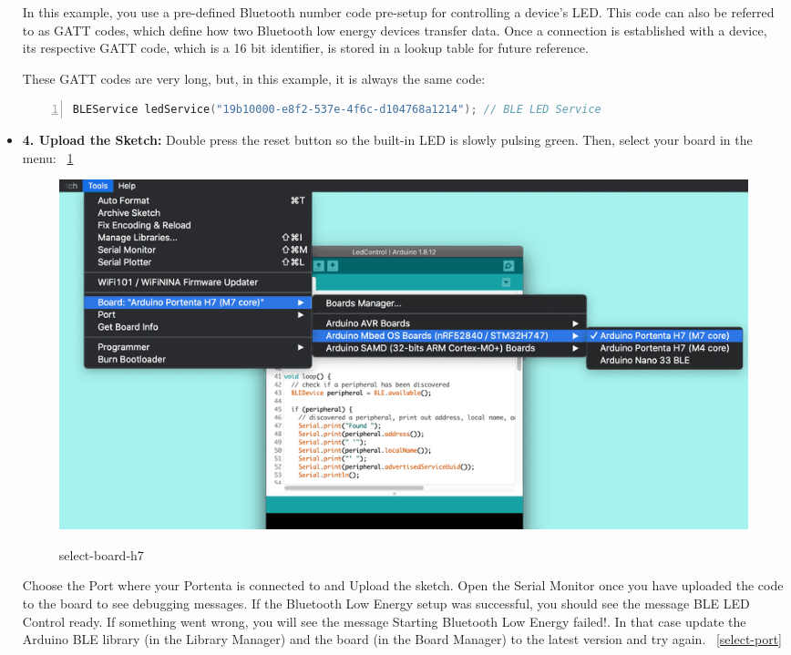 \begin{itemize}
	{
		\label{PortentaBLE}
	}
	
	
	In this example, you use a pre-defined Bluetooth number code pre-setup for controlling a device's LED. This code can also be referred to as GATT codes, which define how two Bluetooth  low energy devices transfer data. Once a connection is established with a device, its respective GATT code, which is a 16 bit identifier, is stored in a lookup table for future reference.
	
	These GATT codes are very long, but, in this example, it is always the same code: \cite{bluetoothPortentaH7:2024}
	
	\begin{lstlisting}[language=C++, frame=single, numbers=left, basicstyle=\ttfamily\small]
		BLEService ledService("19b10000-e8f2-537e-4f6c-d104768a1214"); // BLE LED Service
	\end{lstlisting}
	
	\item \textbf{4. Upload the Sketch:} Double press the reset button so the built-in LED is slowly pulsing green. Then, select your board in the menu:  ~\ref{Select-board-h7}
	\begin{figure}
		\begin{center}
			\includegraphics[width=0.7\linewidth]{Images/PortentaH7/select-board-h7.png}
			\caption{select-board-h7}
			\label{Select-board-h7} \cite{bluetoothPortentaH7:2024}
		\end{center}
	\end{figure}
	
	Choose the Port where your Portenta is connected to and Upload the sketch. Open the Serial Monitor once you have uploaded the code to the board to see debugging messages. If the Bluetooth  Low Energy setup was successful, you should see the message BLE LED Control ready. If something went wrong, you will see the message Starting Bluetooth Low Energy failed!. In that case update the Arduino BLE library (in the Library Manager) and the board (in the Board Manager) to the latest version and try again. ~\ref{select-port} \cite{bluetoothPortentaH7:2024}
	

\end{itemize}

